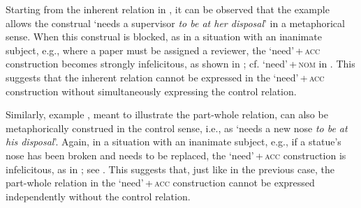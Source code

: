 \documentclass[output=paper]{langscibook}
\begin{document}
\noindent Starting from the inherent relation in , it can be observed that the example allows the construal `needs a supervisor \textit{to be at her disposal}' in a metaphorical sense. When this construal is blocked, as in a situation with an inanimate subject, e.g., where a paper must be assigned a reviewer, the `need'\,+\,\textsc{acc} construction becomes strongly infelicitous, as shown in ; cf. `need'\,+\,\textsc{nom} in . This suggests that the inherent relation cannot be expressed in the `need'\,+\,\textsc{acc} construction without simultaneously expressing the control relation.

\ea\judgewidth{\#} \label{inherent-inan-context}
\z\z

\noindent Similarly, example , meant to illustrate the part-whole relation, can also be metaphorically construed in the control sense, i.e., as `needs a new nose \textit{to be at his disposal}'. Again, in a situation with an inanimate subject, e.g., if a statue's nose has been broken and needs to be replaced, the `need'\,+\,\textsc{acc} construction is infelicitous, as in ; see . This suggests that, just like in the previous case, the part-whole relation in the `need'\,+\,\textsc{acc} construction cannot be expressed independently without the control relation.

\ea \judgewidth{\#}\label{part-whole-inan-context}
\z\z
\end{document}
